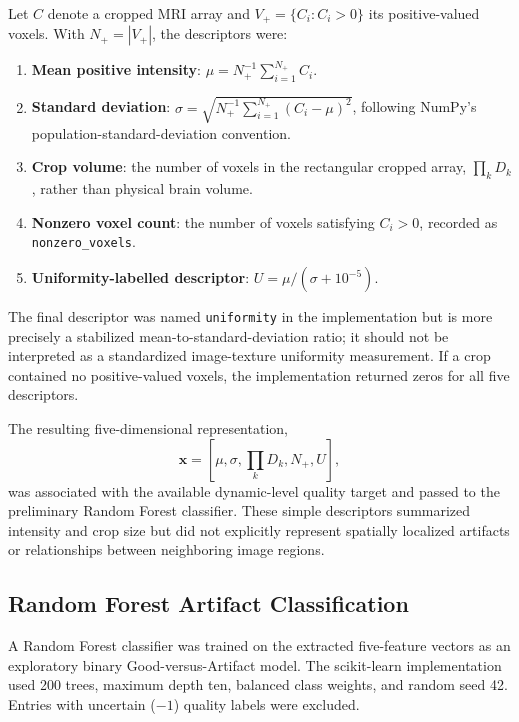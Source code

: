 Let $C$ denote a cropped MRI array and $V_+=\{C_i:C_i>0\}$ its positive-valued voxels. With $N_+=|V_+|$, the descriptors were:

\begin{enumerate}
\item \textbf{Mean positive intensity}: $\mu=N_+^{-1}\sum_{i=1}^{N_+}C_i$.
\item \textbf{Standard deviation}: $\sigma=\sqrt{N_+^{-1}\sum_{i=1}^{N_+}(C_i-\mu)^2}$, following NumPy's population-standard-deviation convention.
\item \textbf{Crop volume}: the number of voxels in the rectangular cropped array, $\prod_k D_k$, rather than physical brain volume.
\item \textbf{Nonzero voxel count}: the number of voxels satisfying $C_i>0$, recorded as \texttt{nonzero\_voxels}.
\item \textbf{Uniformity-labelled descriptor}: $U=\mu/(\sigma+10^{-5})$.
\end{enumerate}

The final descriptor was named \texttt{uniformity} in the implementation but is more precisely a stabilized mean-to-standard-deviation ratio; it should not be interpreted as a standardized image-texture uniformity measurement. If a crop contained no positive-valued voxels, the implementation returned zeros for all five descriptors.

The resulting five-dimensional representation,
\begin{equation}
\mathbf{x}=[\mu,\sigma,\prod_kD_k,N_+,U],
\end{equation}
was associated with the available dynamic-level quality target and passed to the preliminary Random Forest classifier. These simple descriptors summarized intensity and crop size but did not explicitly represent spatially localized artifacts or relationships between neighboring image regions.

\subsection{Random Forest Artifact Classification}
\label{subsec:preliminary_random_forest}

A Random Forest classifier was trained on the extracted five-feature vectors as an exploratory binary Good-versus-Artifact model. The scikit-learn implementation used 200 trees, maximum depth ten, balanced class weights, and random seed 42. Entries with uncertain ($-1$) quality labels were excluded.

